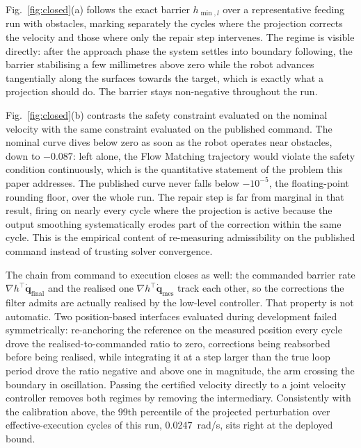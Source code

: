 \documentclass[journal]{IEEEtran}
\newcommand{\qdot}{\dot{\mathbf{q}}}
\begin{document}
Fig.~\ref{fig:closed}(a) follows the exact barrier $h_{\min,l}$ over a representative feeding run with obstacles, marking separately the cycles where the projection corrects the velocity and those where only the repair step intervenes. The regime is visible directly: after the approach phase the system settles into boundary following, the barrier stabilising a few millimetres above zero while the robot advances tangentially along the surfaces towards the target, which is exactly what a projection should do. The barrier stays non-negative throughout the run.

Fig.~\ref{fig:closed}(b) contrasts the safety constraint evaluated on the nominal velocity with the same constraint evaluated on the published command. The nominal curve dives below zero as soon as the robot operates near obstacles, down to $-0.087$: left alone, the Flow Matching trajectory would violate the safety condition continuously, which is the quantitative statement of the problem this paper addresses. The published curve never falls below $-10^{-5}$, the floating-point rounding floor, over the whole run. The repair step is far from marginal in that result, firing on nearly every cycle where the projection is active because the output smoothing systematically erodes part of the correction within the same cycle. This is the empirical content of re-measuring admissibility on the published command instead of trusting solver convergence.

The chain from command to execution closes as well: the commanded barrier rate $\nabla h^{\top}\qdot_{\mathrm{final}}$ and the realised one $\nabla h^{\top}\qdot_{\mathrm{mes}}$ track each other, so the corrections the filter admits are actually realised by the low-level controller. That property is not automatic. Two position-based interfaces evaluated during development failed symmetrically: re-anchoring the reference on the measured position every cycle drove the realised-to-commanded ratio to zero, corrections being reabsorbed before being realised, while integrating it at a step larger than the true loop period drove the ratio negative and above one in magnitude, the arm crossing the boundary in oscillation. Passing the certified velocity directly to a joint velocity controller removes both regimes by removing the intermediary. Consistently with the calibration above, the 99th percentile of the projected perturbation over effective-execution cycles of this run, 0.0247~rad/s, sits right at the deployed bound.
\end{document}
